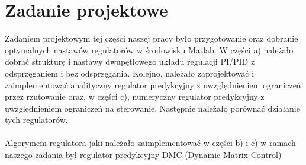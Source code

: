 \chapter{Zadanie projektowe}

Zadaniem projektowym tej części naszej pracy było przygotowanie oraz dobranie optymalnych nastawów regulatorów w środowisku Matlab. W części a) należało dobrać strukturę i nastawy dwupętlowego układu regulacji PI/PID z odsprzęganiem i bez odsprzęgania. Kolejno, należało zaprojektować i zaimplementować analityczny regulator predykcyjny z uwzględnieniem ograniczeń przez rzutowanie oraz, w części c), numeryczny regulator predykcyjny z uwzględnieniem ograniczeń na sterowanie. Następnie należało porównać działanie tych regulatorów.
\\\\ Algorymem regulatora jaki należało zaimplementować w części b) i c) w ramach naszego zadania był regulator predykcyjny DMC (Dynamic Matrix Control)\\\\

